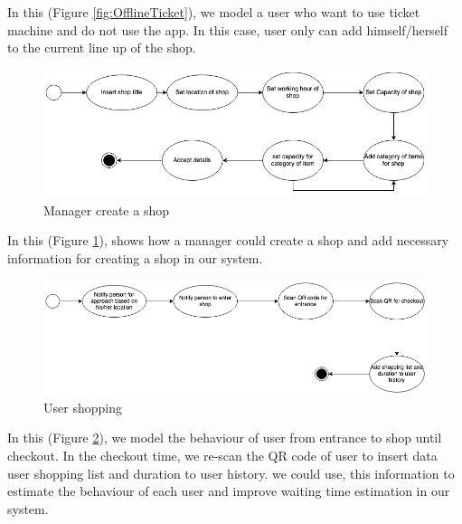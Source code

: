 In this (Figure \ref{fig:OfflineTicket}), we model a user who want to use ticket machine and do not use the app. In this case, user only can add himself/herself to the current line up of the shop.

\begin{figure}[H]
  \includegraphics[width=\textwidth,height=\textheight,keepaspectratio]{images/CreateShop.png}
  \caption{Manager create a shop}
  \label{fig:CreateShop}
\end{figure}

In this (Figure \ref{fig:CreateShop}), shows how a manager could create a shop and add necessary information for creating a shop in our system.

\begin{figure}[H]
  \includegraphics[width=\textwidth,height=\textheight,keepaspectratio]{images/Shopping.png}
  \caption{User shopping}
  \label{fig:shopping}
\end{figure}

In this (Figure \ref{fig:shopping}), we model the behaviour of user from entrance to shop until checkout. In the checkout time, we re-scan the QR code of user to insert data user shopping list and duration to user history. we could use, this information to estimate the behaviour of each user and improve waiting time estimation in our system.